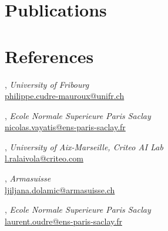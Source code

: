 \documentclass[a4paper,12pt]{article}
\begin{document}
\section{Publications}

\nocite{*}
\printbibliography[keyword=enclosed, title={Five Selected publications}]
\printbibliography[keyword=mypaper, title={All publications }]%

\section{References}
, \textit{University of Fribourg}\\	\hfill \url{philippe.cudre-mauroux@unifr.ch}

, \textit{Ecole Normale Superieure Paris Saclay}\\ \hfill \url{nicolas.vayatis@ens-paris-saclay.fr}

, \textit{University of Aix-Marseille, Criteo AI Lab}\\ \hfill \url{l.ralaivola@criteo.com}

, \textit{Armasuisse}\\ \hfill \url{ljiljana.dolamic@armasuisse.ch}

, \textit{Ecole Normale Superieure Paris Saclay}\\ \hfill \url{laurent.oudre@ens-paris-saclay.fr}




\end{document}
